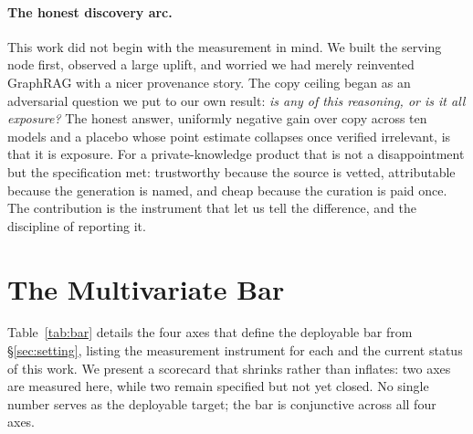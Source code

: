 \documentclass[10pt,twocolumn]{article}
\begin{document}
\paragraph{The honest discovery arc.} This work did not begin with the measurement in mind. We built the serving node first, observed a large uplift, and worried we had merely reinvented GraphRAG with a nicer provenance story. The copy ceiling began as an adversarial question we put to our own result: \emph{is any of this reasoning, or is it all exposure?} The honest answer, uniformly negative gain over copy across ten models and a placebo whose point estimate collapses once verified irrelevant, is that it is exposure. For a private-knowledge product that is not a disappointment but the specification met: trustworthy because the source is vetted, attributable because the generation is named, and cheap because the curation is paid once. The contribution is the instrument that let us tell the difference, and the discipline of reporting it.

\section{The Multivariate Bar}\label{sec:bar}
Table~\ref{tab:bar} details the four axes that define the deployable bar from \S\ref{sec:setting}, listing the measurement instrument for each and the current status of this work. We present a scorecard that shrinks rather than inflates: two axes are measured here, while two remain specified but not yet closed. No single number serves as the deployable target; the bar is conjunctive across all four axes.
\end{document}
